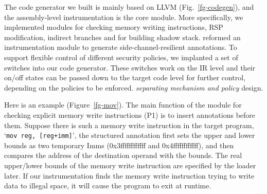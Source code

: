 The code generator we built is mainly based on LLVM (Fig.~\ref{fg-codegen}), and the assembly-level instrumentation is the core module. 
\DIFdelbegin {}\DIFdelend More specifically, we implemented modules for checking memory writing instructions, RSP modification, indirect branches and for building shadow stack. \DIFdelbegin {}\DIFdelend \DIFaddbegin {}\DIFaddend reformed an instrumentation module to generate side-channel-resilient annotations. 
To support flexible control of \DIFdelbegin {}\DIFdelend different security policies, we implanted a set of switches into our code generator. These switches work on the IR level and their on/off states can be passed down to the target code level for further control, depending on the policies to be enforced. \DIFdelbegin {}\DIFdelend \DIFaddbegin {}\DIFaddend \textit{separating mechanism and policy} design\DIFdelbegin {}\DIFdelend \DIFaddbegin {}\DIFaddend .


Here is an example (Figure~\ref{fg-mov}). The main function of the module for checking explicit memory write instructions (P1) is to insert annotations before them. Suppose there is such a memory write instruction in the target program, `\texttt{mov reg, [reg+imm]}',
the structured annotation first sets the upper and lower bounds as two temporary Imms (0x3ffffffffffff and 0x4ffffffffffff), and then compares the address of the destination operand with the bounds. The real upper/lower bounds of the memory write instruction are specified by the loader later. If our instrumentation finds the memory write instruction trying to write data to illegal space, it will cause the program to exit at runtime. 

